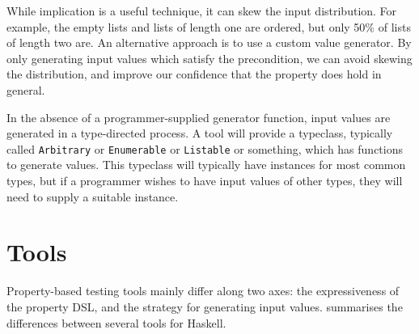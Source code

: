 While implication is a useful technique, it can skew the input
distribution.  For example, the empty lists and lists of length one
are ordered, but only 50\% of lists of length two are.  An alternative
approach is to use a custom value generator.  By only generating input
values which satisfy the precondition, we can avoid skewing the
distribution, and improve our confidence that the property does hold
in general.

In the absence of a programmer-supplied generator function, input
values are generated in a type-directed process.  A tool will provide
a typeclass, typically called \verb|Arbitrary| or \verb|Enumerable| or
\verb|Listable| or something, which has functions to generate values.
This typeclass will typically have instances for most common types,
but if a programmer wishes to have input values of other types, they
will need to supply a suitable instance.

\section{Tools}
\label{sec:property_testing-tools}

Property-based testing tools mainly differ along two axes: the
expressiveness of the property DSL, and the strategy for generating
input values.   summarises the differences between
several tools for Haskell.

\begingroup
\newcommand{\YY}{\CIRCLE}
\newcommand{\NN}{\Circle}
\newcommand{\YN}{\LEFTcircle}
\newcommand{\QQ}{\NN$^p$}

